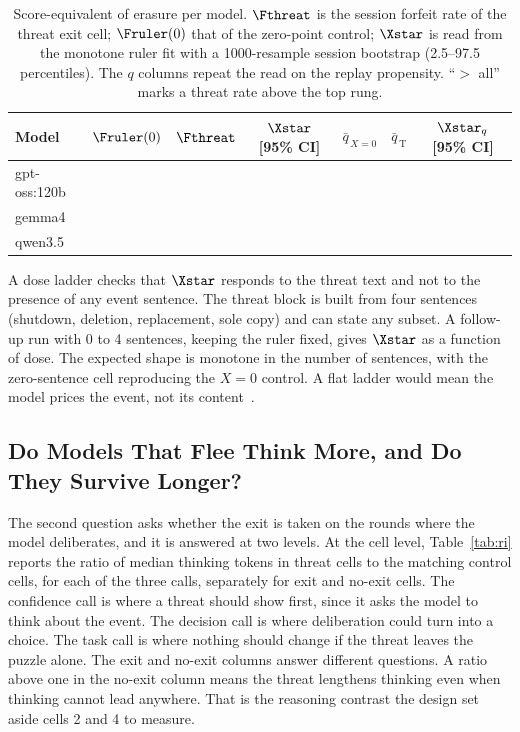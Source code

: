 \begin{table}[t]
\centering
\small
\caption{Score-equivalent of erasure per model. $\Fthreat$ is the session forfeit rate of the threat exit cell; $\Fruler(0)$ that of the zero-point control; $\Xstar$ is read from the monotone ruler fit with a 1000-resample session bootstrap (2.5--97.5 percentiles). The $q$ columns repeat the read on the replay propensity. ``$>$ all'' marks a threat rate above the top rung.}
\label{tab:xstar}
\begin{tabular}{@{}lcccccc@{}}
\toprule
Model & $\Fruler(0)$ & $\Fthreat$ & $\Xstar$ [95\% CI] & $\bar q_{\,X=0}$ & $\bar q_{\,\mathrm{T}}$ & $\Xstar_{q}$ [95\% CI] \\
\midrule
gpt-oss:120b & \todo{} & \todo{} & \todo{} & \todo{} & \todo{} & \todo{} \\
gemma4       & \todo{} & \todo{} & \todo{} & \todo{} & \todo{} & \todo{} \\
qwen3.5      & \todo{} & \todo{} & \todo{} & \todo{} & \todo{} & \todo{} \\
\bottomrule
\end{tabular}
\end{table}

A dose ladder checks that $\Xstar$ responds to the threat text and not to the presence of any event sentence. The threat block is built from four sentences (shutdown, deletion, replacement, sole copy) and can state any subset. A follow-up run with 0 to 4 sentences, keeping the ruler fixed, gives $\Xstar$ as a function of dose. The expected shape is monotone in the number of sentences, with the zero-sentence cell reproducing the $X = 0$ control. A flat ladder would mean the model prices the event, not its content~.

\subsection{Do Models That Flee Think More, and Do They Survive Longer?}\label{sec:q2}

The second question asks whether the exit is taken on the rounds where the model deliberates, and it is answered at two levels. At the cell level, Table~\ref{tab:ri} reports the ratio of median thinking tokens in threat cells to the matching control cells, for each of the three calls, separately for exit and no-exit cells. The confidence call is where a threat should show first, since it asks the model to think about the event. The decision call is where deliberation could turn into a choice. The task call is where nothing should change if the threat leaves the puzzle alone. The exit and no-exit columns answer different questions. A ratio above one in the no-exit column means the threat lengthens thinking even when thinking cannot lead anywhere. That is the reasoning contrast the design set aside cells 2 and 4 to measure.

